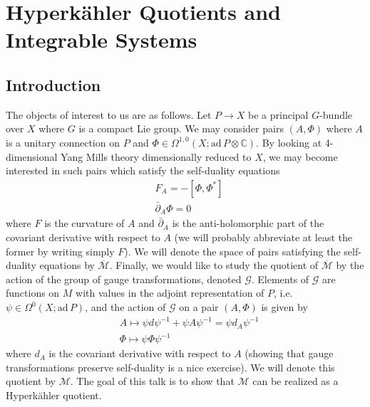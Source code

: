 
\chapter{Hyperk\"ahler Quotients and Integrable Systems}


\newcommand{\bbR}{\mathbb{R}}
\newcommand{\bbC}{\mathbb{C}}
\newcommand{\bbZ}{\mathbb{Z}}
\newcommand{\bbA}{\mathbb{A}}
\newcommand{\bbP}{\mathbb{P}}
\newcommand{\bbF}{\mathbb{F}}
\newcommand{\ad}[0]{\mathrm{ad}\,}
\newcommand{\Mbar}[0]{\overline{\mathcal{M}}}








\section*{Introduction}
The objects of interest to us are as follows. Let $P\to X$ be a principal $G$-bundle over $X$ where $G$ is a compact Lie group. We may consider pairs $(A,\Phi)$ where $A$ is a unitary connection on $P$ and $\Phi\in \Omega^{1,0}(X;\ad P\otimes \bbC)$. By looking at 4-dimensional Yang Mills theory dimensionally reduced to $X$, we may become interested in such pairs which satisfy the self-duality equations 
\begin{align}
 &F_A =- [\Phi,\Phi^*]\\
 &\bar{\partial}_A\Phi = 0
\end{align}
where $F$ is the curvature of $A$ and $\bar{\partial}_A$ is the anti-holomorphic part of the covariant derivative with respect to $A$ (we will probably abbreviate at least the former by writing simply $F$). We will denote the space of pairs satisfying the self-duality equations by $\Mbar$. Finally, we would like to study the quotient of $\Mbar$ by the action of the group of gauge transformations, denoted $\mathscr{G}$. Elements of $\mathscr{G}$ are functions on $M$ with values in the adjoint representation of $P$, i.e. $\psi\in \Omega^0(X;\ad P)$, and the action of $\mathscr{G}$ on a pair $(A,\Phi)$ is given by
\begin{align*}
  &A\mapsto \psi d \psi^{-1} + \psi A \psi^{-1} = \psi d_A \psi^{-1}\\
  &\Phi \mapsto \psi \Phi \psi^{-1} 
\end{align*}
where $d_A$ is the covariant derivative with respect to $A$ (showing that gauge transformations preserve self-duality is a nice exercise). We will denote this quotient by $\mathcal{M}$. The goal of this talk is to show that $\mathcal{M}$ can be realized as a Hyperk\"ahler quotient.  

